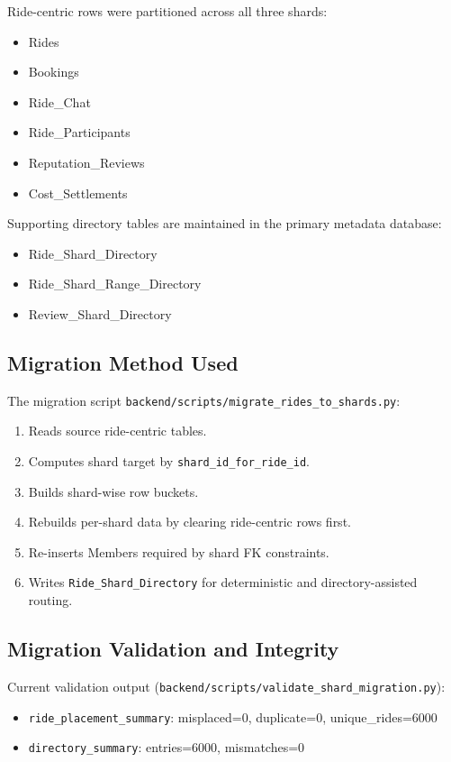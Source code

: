 \documentclass[12pt]{article}
\begin{document}
Ride-centric rows were partitioned across all three shards:
\begin{itemize}
    \item Rides
    \item Bookings
    \item Ride\_Chat
    \item Ride\_Participants
    \item Reputation\_Reviews
    \item Cost\_Settlements
\end{itemize}

Supporting directory tables are maintained in the primary metadata database:
\begin{itemize}
    \item Ride\_Shard\_Directory
    \item Ride\_Shard\_Range\_Directory
    \item Review\_Shard\_Directory
\end{itemize}

\subsection{Migration Method Used}

The migration script \texttt{backend/scripts/migrate\_rides\_to\_shards.py}:
\begin{enumerate}
    \item Reads source ride-centric tables.
    \item Computes shard target by \texttt{shard\_id\_for\_ride\_id}.
    \item Builds shard-wise row buckets.
    \item Rebuilds per-shard data by clearing ride-centric rows first.
    \item Re-inserts Members required by shard FK constraints.
    \item Writes \texttt{Ride\_Shard\_Directory} for deterministic and directory-assisted routing.
\end{enumerate}

\subsection{Migration Validation and Integrity}

Current validation output (\texttt{backend/scripts/validate\_shard\_migration.py}):
\begin{itemize}
    \item \texttt{ride\_placement\_summary}: misplaced=0, duplicate=0, unique\_rides=6000
    \item \texttt{directory\_summary}: entries=6000, mismatches=0
\end{itemize}
\end{document}
